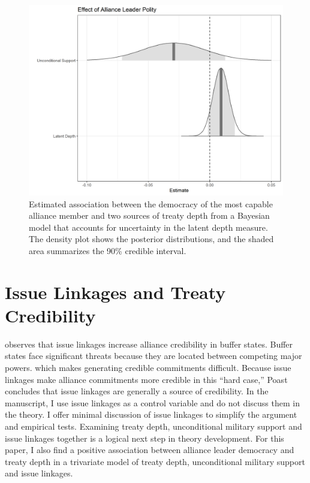 \documentclass[12pt]{article}
\begin{document}
\begin{figure}
\includegraphics[width=.95\textwidth]{results-unc-depth.png}  
\caption{Estimated association between the democracy of the most capable alliance member and two sources of treaty depth from a Bayesian model that accounts for uncertainty in the latent depth measure. The density plot shows the posterior distributions, and the shaded area summarizes the 90\% credible interval.}
\label{fig:results-unc-depth}
\end{figure}



\section{Issue Linkages and Treaty Credibility}


\citep{Poast2013} observes that issue linkages increase alliance credibility in buffer states.
Buffer states face significant threats because they are located between competing major powers. which makes generating credible commitments difficult.
Because issue linkages make alliance commitments more credible in this ``hard case,'' Poast concludes that issue linkages are generally a source of credibility.
In the manuscript, I use issue linkages as a control variable and do not discuss them in the theory. 
I offer minimal discussion of issue linkages to simplify the argument and empirical tests. 
Examining treaty depth, unconditional military support and issue linkages together is a logical next step in theory development. 
For this paper, I also find a positive association between alliance leader democracy and treaty depth in a trivariate model of treaty depth, unconditional military support and issue linkages. 
\end{document}
